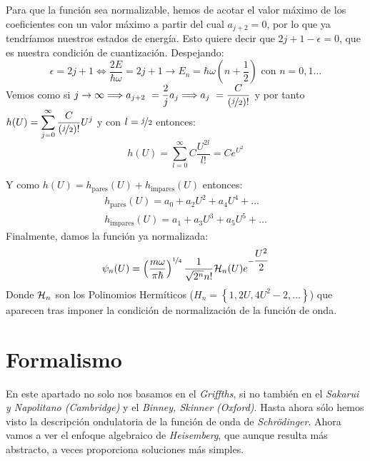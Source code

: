 \documentclass{report}
\begin{document}
    \noindent Para que la función sea normalizable, hemos de acotar el valor máximo de los coeficientes
    con un valor máximo a partir del cual $a_{j+2}=0$,
    por lo que ya tendríamos nuestros estados de energía. Esto quiere decir
    que $2j+1-\epsilon=0$, que es nuestra condición de cuantización. Despejando:
    \[\epsilon=2j+1\Longleftrightarrow \dfrac{2E}{\hbar\omega}=2j+1
    \longrightarrow\boxed{E_n=\hbar\omega\left(n+\dfrac12\right)}\text{ con }n=0,1\dots\]
    Vemos como si $j\rightarrow\infty\Longrightarrow a_{j+2}~=\dfrac{2}{j}a_j\Longrightarrow
    a_j~=\dfrac{C}{\left(\nicefrac{j}{2}\right)!}$ y por tanto $h(U)=\displaystyle\sum_{j=0}^\infty
    \dfrac{C}{\left(\nicefrac{j}{2}\right)!}U^j$ y con $l=\nicefrac{j}{2}$ entonces:\\

    \[h(U)=\displaystyle\sum_{l=0}^\infty C\dfrac{U^{2l}}{l!}=Ce^{U^2}\]

    \noindent Y como $h(U)=h_{\text{pares}}(U)+h_{\text{impares}}(U)$ entonces:
    \[\begin{aligned}
      h_{\text{pares}}(U)=a_0+a_2U^2+a_4U^4+\dots\\
      h_{\text{impares}}(U)=a_1+a_3U^3+a_5U^5+\dots
    \end{aligned}\]
    \noindent Finalmente, damos la función ya normalizada:
    \[\psi_n(U)=\left(\dfrac{m\omega}{\pi\hbar}\right)^{\nicefrac{1}{4}}
    \dfrac{1}{\sqrt{2^n}n!}\mathcal{H}_n(U)e^{-\dfrac{U^2}{2}}\]
    Donde $\mathcal{H}_n$ son los Polinomios Hermíticos ($H_n=\left\{1,2U,4U^2-2,\dots\right\}$)
    que aparecen tras imponer la condición de normalización de la función
    de onda.
\chapter{Formalismo}
  \vspace{0.3cm}
  \noindent En este apartado no solo nos basamos en el \textit{Griffths}, si no
  también en el \textit{Sakarui y Napolitano (Cambridge)} y el 
  \textit{Binney, Skinner (Oxford)}. 
  \noindent Hasta ahora sólo hemos visto la descripción ondulatoria de 
  la función de onda de \textit{Schrödinger}. Ahora vamos a ver el
  enfoque algebraico de \textit{Heisemberg}, que aunque resulta más abstracto,
  a veces proporciona soluciones más simples.
  \vspace{0.2cm}
\end{document}
